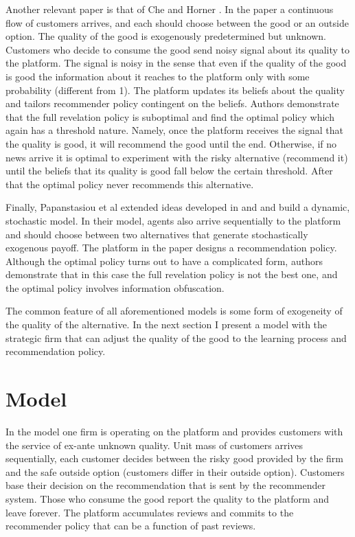 \documentclass[a4paper]{article}
\begin{document}
	
	
	
	Another relevant paper is that of Che and Horner \cite{che2015}. In the paper a continuous flow of customers arrives, and each should choose between the good or an outside option. The quality of the good is exogenously predetermined but unknown. Customers who decide to consume the good send noisy signal about its quality to the platform. The signal is noisy in the sense that even if the quality of the good is good the information about it reaches to the platform only with some probability (different from 1). The platform updates its beliefs about the quality and tailors recommender policy contingent on the beliefs. Authors demonstrate that the full revelation policy is suboptimal and find the optimal policy which again has a threshold nature. Namely, once the platform receives the signal that the quality is good, it will recommend the good until the end. Otherwise, if no news arrive it is optimal to experiment with the risky alternative (recommend it) until the beliefs that its quality is good fall below the certain threshold. After that the optimal policy never recommends this alternative.
	
	
	
	Finally, Papanstasiou et al \cite{papanastasiou2017} extended ideas developed in \cite{kremer2014} and \cite{che2015} and build a dynamic, stochastic model. In their model, agents also arrive sequentially to the platform and should choose between two alternatives that generate stochastically exogenous payoff. The platform in the paper designs a recommendation policy. Although the optimal policy turns out to have a complicated form, authors demonstrate that in this case the full revelation policy is not the best one, and the optimal policy involves information obfuscation.
	
	
	
	
	The common feature of all aforementioned models is some form of exogeneity of the quality of the alternative. In the next section I present a model with the strategic firm that can adjust the quality of the good to the learning process and recommendation policy.
	
	\section{Model}
	In the model one firm is operating on the platform and provides customers with the service of ex-ante unknown quality. Unit mass of customers arrives sequentially, each customer decides between the risky good provided by the firm and the safe outside option (customers differ in their outside option). Customers base their decision on the recommendation that is sent by the recommender system. Those who consume the good report the quality to the platform and leave forever. The platform accumulates reviews and commits to the recommender policy that can be a function of past reviews.
	
\end{document}
